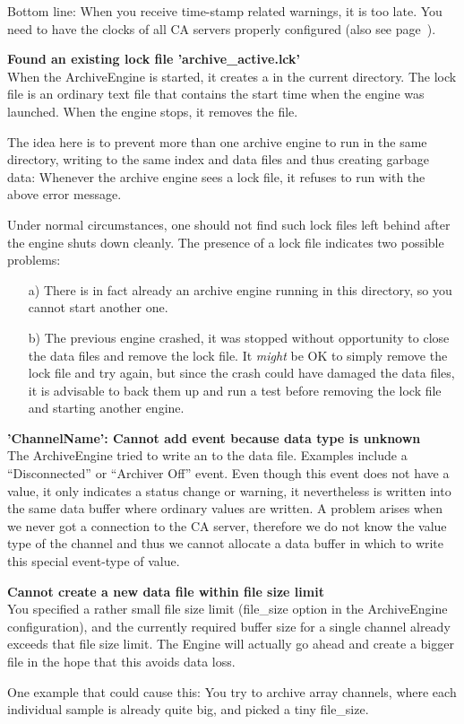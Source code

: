 Bottom line: When you receive time-stamp related warnings, it is too
late. You need to have the clocks of all CA servers properly configured
(also see page~\pageref{back:in:time}).

\noindent
\textbf{Found an existing lock file 'archive\_active.lck'}\\
When the ArchiveEngine is started, it creates a  in
the current directory. The lock file is an ordinary text file
that contains the start time when the engine was launched. When
the engine stops, it removes the file.

The idea here is to prevent more than one archive engine to run
in the same directory, writing to the same index and data files
and thus creating garbage data: Whenever the archive engine sees
a lock file, it refuses to run with the above error message.

Under normal circumstances, one should not find such lock files
left behind after the engine shuts down cleanly. The presence of
a lock file indicates two possible problems:
\begin{enumerate}
\item[a)] There is in fact already an archive engine running in
this directory, so you cannot start another one.
\item[b)] The previous engine crashed, it was stopped without
opportunity to close the data files and remove the lock file.
It \emph{might} be OK to simply remove the lock file and try
again, but since the crash could have damaged the data files, it
is advisable to back them up and run a test before removing the
lock file and starting another engine.
\end{enumerate}

\noindent
\textbf{'ChannelName': Cannot add event because data type is unknown}\\
The ArchiveEngine tried to write an  to the data
file. Examples include a ``Disconnected'' or ``Archiver Off''
event. Even though this event does not have a value, it only
indicates a status change or warning, it nevertheless is written
into the same data buffer where ordinary values are written.
A problem arises when we never got a connection to the CA
server, therefore we do not know the value type of the channel
and thus we cannot allocate a data buffer in which to write this
special event-type of value.

\noindent
\textbf{Cannot create a new data file within file size limit}\\
You specified a rather small file size limit (file\_size option in the
ArchiveEngine configuration), and the currently required buffer size
for a single channel already exceeds that file size limit.
The Engine will actually go ahead and create a bigger file in the hope
that this avoids data loss.

One example that could cause this: You try to archive array channels,
where each individual sample is already quite big, and picked a tiny
file\_size. 
